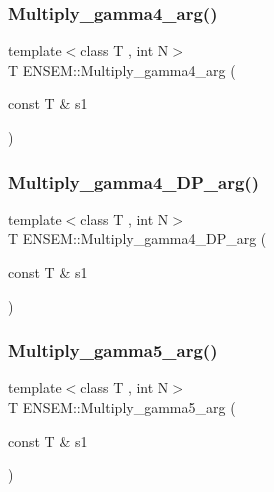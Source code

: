 \mbox{\label{namespaceENSEM_a2916fde58e73dd7198d447fe45384334}} 
\subsubsection{\texorpdfstring{Multiply\_gamma4\_arg()}{Multiply\_gamma4\_arg()}}
{\footnotesize\ttfamily template$<$class T , int N$>$ \\
T E\+N\+S\+E\+M\+::\+Multiply\+\_\+gamma4\+\_\+arg (\begin{DoxyParamCaption}\item[{const T \&}]{s1 }\end{DoxyParamCaption})\hspace{0.3cm}{\ttfamily [inline]}}

\mbox{\label{namespaceENSEM_a0026955723cecd4a7e2efd8d4f2056b5}} 
\subsubsection{\texorpdfstring{Multiply\_gamma4\_DP\_arg()}{Multiply\_gamma4\_DP\_arg()}}
{\footnotesize\ttfamily template$<$class T , int N$>$ \\
T E\+N\+S\+E\+M\+::\+Multiply\+\_\+gamma4\+\_\+\+D\+P\+\_\+arg (\begin{DoxyParamCaption}\item[{const T \&}]{s1 }\end{DoxyParamCaption})\hspace{0.3cm}{\ttfamily [inline]}}

\mbox{\label{namespaceENSEM_aa00dbaa87256bd8e2480f91ceb976cb6}} 
\subsubsection{\texorpdfstring{Multiply\_gamma5\_arg()}{Multiply\_gamma5\_arg()}}
{\footnotesize\ttfamily template$<$class T , int N$>$ \\
T E\+N\+S\+E\+M\+::\+Multiply\+\_\+gamma5\+\_\+arg (\begin{DoxyParamCaption}\item[{const T \&}]{s1 }\end{DoxyParamCaption})\hspace{0.3cm}{\ttfamily [inline]}}

